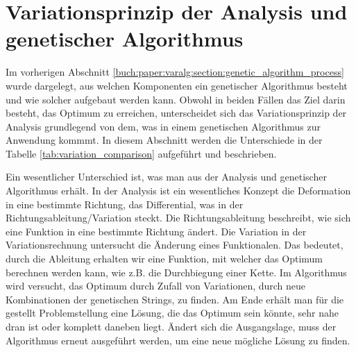 %
%
%
%
\section{Variationsprinzip der Analysis und genetischer Algorithmus
  \label{buch:paper:varalg:section:variations_analysis_algorithm_result}}
Im vorherigen Abschnitt \ref{buch:paper:varalg:section:genetic_algorithm_process}
wurde dargelegt, aus welchen Komponenten ein genetischer Algorithmus besteht und wie 
solcher aufgebaut werden kann. 
Obwohl in beiden Fällen das Ziel darin besteht, das Optimum zu erreichen, unterscheidet
sich das Variationsprinzip der Analysis grundlegend von dem, was in einem genetischen 
Algorithmus zur Anwendung kommmt. In diesem Abschnitt werden die Unterschiede in der 
Tabelle \ref{tab:variation_comparison} aufgeführt und beschrieben.

Ein wesentlicher Unterschied ist, was man aus der Analysis und genetischer Algorithmus 
erhält. In der Analysis ist ein wesentliches Konzept die Deformation in eine bestimmte 
Richtung, das Differential, was in der Richtungsableitung/Variation steckt. Die Richtungsableitung 
beschreibt, wie sich eine Funktion in eine bestimmte Richtung ändert. Die Variation in  
der Variationsrechnung untersucht die Änderung eines Funktionalen. Das bedeutet, durch die Ableitung 
erhalten wir eine Funktion, mit welcher das Optimum berechnen werden kann, wie z.B. die  
Durchbiegung einer Kette. Im Algorithmus wird versucht, das Optimum durch Zufall von   
Variationen, durch neue Kombinationen der genetischen Strings, zu finden. Am 
Ende erhält man für die gestellt Problemstellung eine Lösung, die das Optimum sein könnte,  
sehr nahe dran ist oder komplett daneben liegt. Ändert sich die Ausgangslage, muss der Algorithmus 
erneut ausgeführt werden, um eine neue mögliche Lösung zu finden. 

